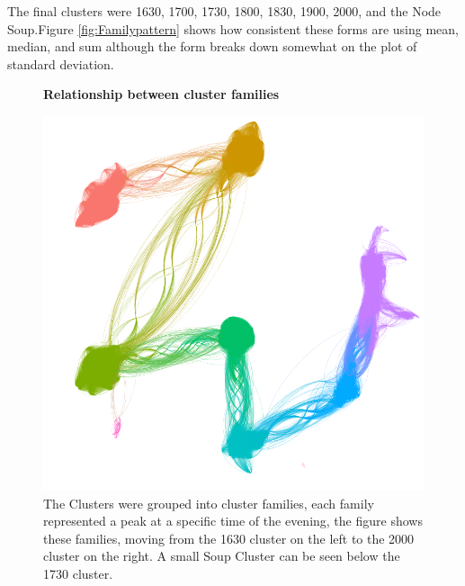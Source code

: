 The final clusters were 1630, 1700, 1730, 1800, 1830, 1900, 2000, and the Node Soup.Figure \ref{fig:Familypattern} shows how consistent these forms are using mean, median, and sum although the form breaks down somewhat on the plot of standard deviation.


\begin{figure}[ht]
    \centering
    \textbf{Relationship between cluster families}\par\medskip
    \includegraphics[width=\textwidth]{Figures/Results/Dragon2}
    \caption[Cluster family Graph]{The Clusters were grouped into cluster families, each family represented a peak at a specific time of the evening, the figure shows these families, moving from the 1630 cluster on the left to the 2000 cluster on the right. A small Soup Cluster can be seen below the 1730 cluster.}
    \label{fig:DragonPlot}
\end{figure}


